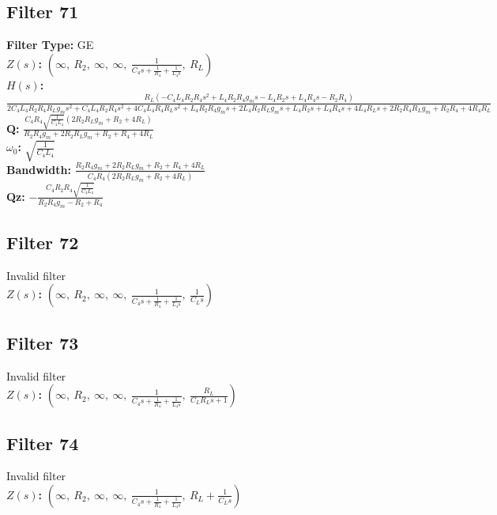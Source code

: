 \documentclass{article}
\begin{document}
\subsection*{Filter 71}
\textbf{Filter Type:} GE \\ 
\textbf{$Z(s)$:} $\left( \infty, \  R_{2}, \  \infty, \  \infty, \  \frac{1}{C_{4} s + \frac{1}{R_{4}} + \frac{1}{L_{4} s}}, \  R_{L}\right)$ \\ 
\textbf{$H(s)$:} $\frac{R_{L} \left(- C_{4} L_{4} R_{2} R_{4} s^{2} + L_{4} R_{2} R_{4} g_{m} s - L_{4} R_{2} s + L_{4} R_{4} s - R_{2} R_{4}\right)}{2 C_{4} L_{4} R_{2} R_{4} R_{L} g_{m} s^{2} + C_{4} L_{4} R_{2} R_{4} s^{2} + 4 C_{4} L_{4} R_{4} R_{L} s^{2} + L_{4} R_{2} R_{4} g_{m} s + 2 L_{4} R_{2} R_{L} g_{m} s + L_{4} R_{2} s + L_{4} R_{4} s + 4 L_{4} R_{L} s + 2 R_{2} R_{4} R_{L} g_{m} + R_{2} R_{4} + 4 R_{4} R_{L}}$ \\ 
\textbf{Q:} $\frac{C_{4} R_{4} \sqrt{\frac{1}{C_{4} L_{4}}} \left(2 R_{2} R_{L} g_{m} + R_{2} + 4 R_{L}\right)}{R_{2} R_{4} g_{m} + 2 R_{2} R_{L} g_{m} + R_{2} + R_{4} + 4 R_{L}}$ \\ 
\textbf{$\omega_0$:} $\sqrt{\frac{1}{C_{4} L_{4}}}$ \\ 
\textbf{Bandwidth:} $\frac{R_{2} R_{4} g_{m} + 2 R_{2} R_{L} g_{m} + R_{2} + R_{4} + 4 R_{L}}{C_{4} R_{4} \left(2 R_{2} R_{L} g_{m} + R_{2} + 4 R_{L}\right)}$ \\ 
\textbf{Qz:} $- \frac{C_{4} R_{2} R_{4} \sqrt{\frac{1}{C_{4} L_{4}}}}{R_{2} R_{4} g_{m} - R_{2} + R_{4}}$ \\ 
\subsection*{Filter 72}
Invalid filter \\ 
\textbf{$Z(s)$:} $\left( \infty, \  R_{2}, \  \infty, \  \infty, \  \frac{1}{C_{4} s + \frac{1}{R_{4}} + \frac{1}{L_{4} s}}, \  \frac{1}{C_{L} s}\right)$ \\ 
\subsection*{Filter 73}
Invalid filter \\ 
\textbf{$Z(s)$:} $\left( \infty, \  R_{2}, \  \infty, \  \infty, \  \frac{1}{C_{4} s + \frac{1}{R_{4}} + \frac{1}{L_{4} s}}, \  \frac{R_{L}}{C_{L} R_{L} s + 1}\right)$ \\ 
\subsection*{Filter 74}
Invalid filter \\ 
\textbf{$Z(s)$:} $\left( \infty, \  R_{2}, \  \infty, \  \infty, \  \frac{1}{C_{4} s + \frac{1}{R_{4}} + \frac{1}{L_{4} s}}, \  R_{L} + \frac{1}{C_{L} s}\right)$ \\ 
\end{document}
